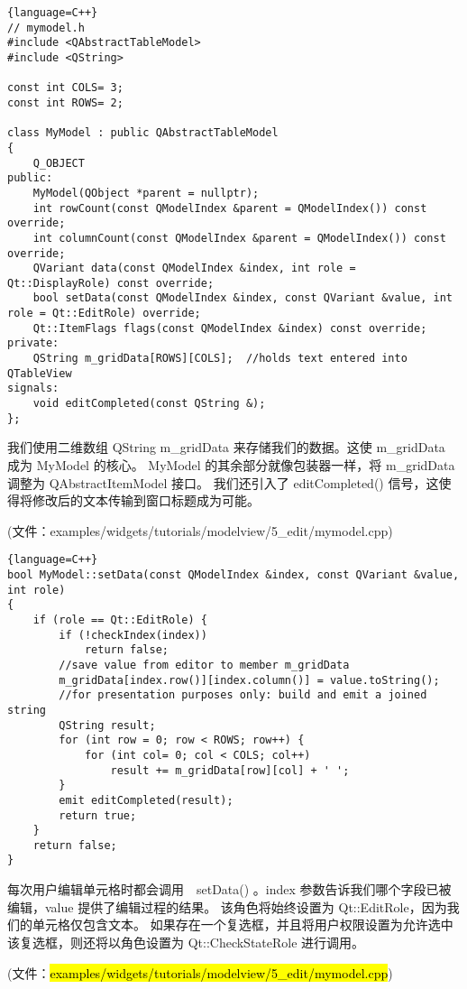 \begin{lstlisting}{language=C++}
// mymodel.h
#include <QAbstractTableModel>
#include <QString>

const int COLS= 3;
const int ROWS= 2;

class MyModel : public QAbstractTableModel
{
    Q_OBJECT
public:
    MyModel(QObject *parent = nullptr);
    int rowCount(const QModelIndex &parent = QModelIndex()) const override;
    int columnCount(const QModelIndex &parent = QModelIndex()) const override;
    QVariant data(const QModelIndex &index, int role = Qt::DisplayRole) const override;
    bool setData(const QModelIndex &index, const QVariant &value, int role = Qt::EditRole) override;
    Qt::ItemFlags flags(const QModelIndex &index) const override;
private:
    QString m_gridData[ROWS][COLS];  //holds text entered into QTableView
signals:
    void editCompleted(const QString &);
};
\end{lstlisting}

我们使用二维数组 QString m\_gridData 来存储我们的数据。这使 m\_gridData 成为 MyModel 的核心。
MyModel 的其余部分就像包装器一样，将 m\_gridData 调整为 QAbstractItemModel 接口。
我们还引入了 editCompleted() 信号，这使得将修改后的文本传输到窗口标题成为可能。

(文件：examples/widgets/tutorials/modelview/5\_edit/mymodel.cpp)

\begin{lstlisting}{language=C++}
bool MyModel::setData(const QModelIndex &index, const QVariant &value, int role)
{
    if (role == Qt::EditRole) {
        if (!checkIndex(index))
            return false;
        //save value from editor to member m_gridData
        m_gridData[index.row()][index.column()] = value.toString();
        //for presentation purposes only: build and emit a joined string
        QString result;
        for (int row = 0; row < ROWS; row++) {
            for (int col= 0; col < COLS; col++)
                result += m_gridData[row][col] + ' ';
        }
        emit editCompleted(result);
        return true;
    }
    return false;
}
\end{lstlisting}
    
每次用户编辑单元格时都会调用　setData() 。index 参数告诉我们哪个字段已被编辑，value 提供了编辑过程的结果。
该角色将始终设置为 Qt::EditRole，因为我们的单元格仅包含文本。
如果存在一个复选框，并且将用户权限设置为允许选中该复选框，则还将以角色设置为 Qt::CheckStateRole 进行调用。

(文件：\hl{examples/widgets/tutorials/modelview/5\_edit/mymodel.cpp})

